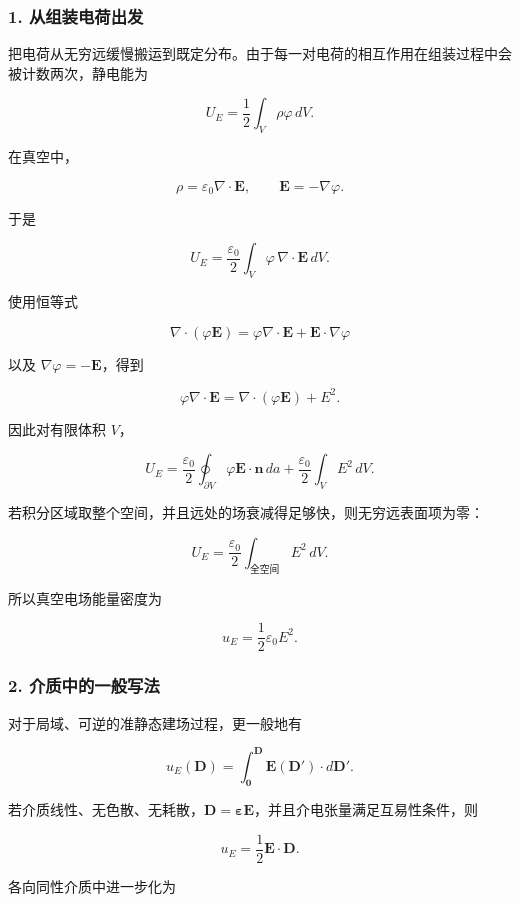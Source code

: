 \subsubsection{1.
从组装电荷出发}\label{m7:ux4eceux7ec4ux88c5ux7535ux8377ux51faux53d1}

把电荷从无穷远缓慢搬运到既定分布。由于每一对电荷的相互作用在组装过程中会被计数两次，静电能为

\[
\boxed{U_E
=\frac12\int_V\rho\varphi\,dV}.
\]

在真空中，

\[
\rho=\varepsilon_0\nabla\cdot\mathbf E,
\qquad
\mathbf E=-\nabla\varphi.
\]

于是

\[
U_E
=\frac{\varepsilon_0}{2}
\int_V\varphi\,\nabla\cdot\mathbf E\,dV.
\]

使用恒等式

\[
\nabla\cdot(\varphi\mathbf E)
=\varphi\nabla\cdot\mathbf E
+\mathbf E\cdot\nabla\varphi
\]

以及 \(\nabla\varphi=-\mathbf E\)，得到

\[
\varphi\nabla\cdot\mathbf E
=\nabla\cdot(\varphi\mathbf E)+E^2.
\]

因此对有限体积 \(V\)，

\[
\boxed{
U_E
=\frac{\varepsilon_0}{2}
\oint_{\partial V}\varphi\mathbf E\cdot\mathbf n\,da
+\frac{\varepsilon_0}{2}\int_VE^2\,dV
}.
\]

若积分区域取整个空间，并且远处的场衰减得足够快，则无穷远表面项为零：

\[
\boxed{U_E
=\frac{\varepsilon_0}{2}\int_{\text{全空间}}E^2\,dV}.
\]

所以真空电场能量密度为

\[
\boxed{u_E=\frac12\varepsilon_0E^2}.
\]

\subsubsection{2.
介质中的一般写法}\label{m7:ux4ecbux8d28ux4e2dux7684ux4e00ux822cux5199ux6cd5}

对于局域、可逆的准静态建场过程，更一般地有

\[
\boxed{
u_E(\mathbf D)
=\int_{\mathbf0}^{\mathbf D}
\mathbf E(\mathbf D')\cdot d\mathbf D'
}.
\]

若介质线性、无色散、无耗散，\(\mathbf D=\boldsymbol\varepsilon\mathbf E\)，并且介电张量满足互易性条件，则

\[
\boxed{u_E=\frac12\mathbf E\cdot\mathbf D}.
\]

各向同性介质中进一步化为

